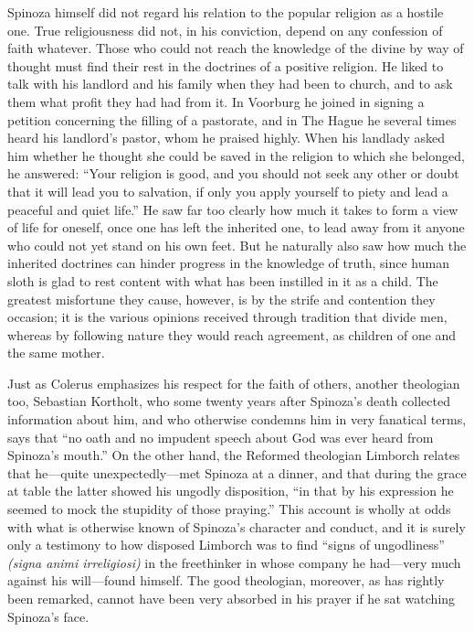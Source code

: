 \documentclass[12pt]{book}
\newcommand{\opage}[1]{\marginnote{\footnotesize\textit{[#1]}}}
\begin{document}
Spinoza himself did not regard his relation to the popular religion as a hostile one.
True religiousness did not, in his conviction, depend on any confession of faith
whatever. Those who could not reach the knowledge of the divine by way of thought must
find their rest in the doctrines of a positive religion. He liked to talk with his
landlord and his family when they had been to church, and to ask them what profit they
had had from it. In Voorburg he joined in signing a petition concerning the filling of
a pastorate, and in The Hague he several times heard his landlord's pastor, whom he
praised highly. When his landlady asked him whether he thought she could be saved in
the religion to which she belonged, he answered: ``Your religion is good, and you
should not seek any \opage{36}other or doubt that it will lead you to salvation, if
only you apply yourself to piety and lead a peaceful and quiet life.'' He saw far too
clearly how much it takes to form a view of life for oneself, once one has left the
inherited one, to lead away from it anyone who could not yet stand on his own feet. But
he naturally also saw how much the inherited doctrines can hinder progress in the
knowledge of truth, since human sloth is glad to rest content with what has been
instilled in it as a child. The greatest misfortune they cause, however, is by the
strife and contention they occasion; it is the various opinions received through
tradition that divide men, whereas by following nature they would reach agreement, as
children of one and the same mother.

Just as Colerus emphasizes his respect for the faith of others, another theologian
too, Sebastian Kortholt, who some twenty years after Spinoza's death collected
information about him, and who otherwise condemns him in very fanatical terms, says
that ``no oath and no impudent speech about God was ever heard from Spinoza's mouth.''
On the other hand, the Reformed theologian Limborch relates that he---quite
unexpectedly---met Spinoza at a dinner, and that during the grace at table the latter
showed his ungodly disposition, ``in that by his expression he seemed to mock the
stupidity of those praying.'' %
This account is wholly at odds with what is otherwise known of Spinoza's character and
conduct, and it is surely only a testimony to how disposed Limborch was to find
``signs of ungodliness'' \textit{(signa animi irreligiosi)} in the free\opage{37}thinker
in whose company he had---very much against his will---found himself. The good
theologian, moreover, as has rightly been remarked, cannot have been very absorbed in
his prayer if he sat watching Spinoza's face.
\end{document}
